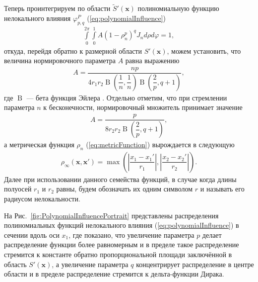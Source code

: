 Теперь проинтегрируем по области $\widetilde{S}' (\boldsymbol{x})$ полиномиальную функцию нелокального влияния $\varphi_{p,q}^{P}$ (\ref{eq:polynomialInfluence})
\begin{gather*}
	\int\limits_0^{2\pi} \int\limits_0^1 A (1 - \rho_n^p)^q J_n d\rho d\varphi = 1,
\end{gather*}
откуда, перейдя обратно к размерной области $S'(\boldsymbol{x})$, можем установить, что величина нормировочного параметра $A$ равна выражению
\begin{gather*}
	A = \dfrac{np}
	{
		4 r_1 r_2 
		\operatorname{B}\left( \dfrac{1}{n}, \dfrac{1}{n} \right) 
		\operatorname{B}\left( \dfrac{2}{p}, q+1 \right)
	},
\end{gather*}
где $\operatorname{B}$ --- бета функция Эйлера \cite{SpecialFunction}.
Отдельно отметим, что при стремлении параметра $n$ к бесконечности, нормировочный множитель принимает значение
\begin{gather*}
	A = \dfrac{p}{8 r_2 r_2 \operatorname{B}\left( \dfrac{2}{p}, q+1 \right)},
\end{gather*}
а метрическая функция $\rho_n$ (\ref{eq:metricFunction}) вырождается в следующую
\begin{gather}
	\label{eq:metricFunctionInfinity}
	\rho_{\infty} (\boldsymbol{x}, \boldsymbol{x}') = 
	\max \left( 
		\left| \dfrac{x_1 - x_1'}{r_1} \right|,
		\left| \dfrac{x_2 - x_2'}{r_2} \right|
	\right).
\end{gather}
Далее при использовании данного семейства функций, в случае когда длины полуосей $r_1$ и $r_2$ равны, будем обозначать их одним символом $r$ и называть его радиусом нелокальности.

На Рис.~\ref{fig:PolynomialInfluencePortrait} представлены распределения полиномиальных функций нелокального влияния (\ref{eq:polynomialInfluence}) в сечении вдоль оси $x_1$, где показано, что увеличение параметра $p$ делает распределение функции более равномерным и в пределе такое распределение стремится к константе обратно пропорциональной площади заключённой в область $S'(\boldsymbol{x})$, а увеличение параметра $q$ концентрирует распределение в центре области и в пределе распределение стремится к дельта-функции Дирака.

